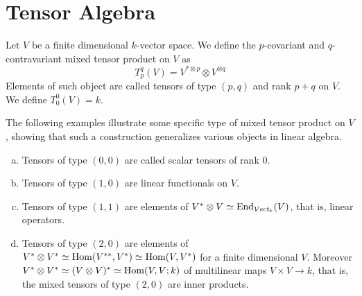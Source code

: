 \section{Tensor Algebra}

\begin{definition}
  Let \(V\) be a finite dimensional \(k\)-vector space. We define the
  \(p\)-covariant and \(q\)-contravariant mixed tensor product on \(V\) as
  \[
    T_p^q(V) = V^{* \otimes p} \otimes V^{\otimes q}
  \]
  Elements of such object are called tensors of type \((p, q)\) and rank \(p +
  q\) on \(V\). We define \(T_0^0(V) = k\).
\end{definition}

\begin{example}
  The following examples illustrate some specific type of mixed tensor product
  on \(V\), showing that such a construction generalizes various objects in
  linear algebra.
  \begin{enumerate}[(a)]
    \item Tensors of type \((0,0)\) are called scalar tensors of rank \(0\).
    \item Tensors of type \((1, 0)\) are linear functionals on \(V\).
    \item Tensors of type \((1, 1)\) are elements of \(V^* \otimes V \simeq
      \operatorname{End}_{{\mathcal{V}\textit{ect}}_k}(V)\), that is, linear operators.
    \item Tensors of type \((2, 0)\) are elements of \(V^* \otimes V^* \simeq
      \operatorname{Hom}(V^{**}, V^*) \simeq \operatorname{Hom}(V, V^*)\) for a finite dimensional \(V\).
      Moreover \(V^* \otimes V^* \simeq (V \otimes V)^* \simeq \operatorname{Hom}(V, V; k)\) of
      multilinear maps \(V \times V \to k\), that is, the mixed tensors of type
      \((2, 0)\) are inner products.
 \end{enumerate}
\end{example}

